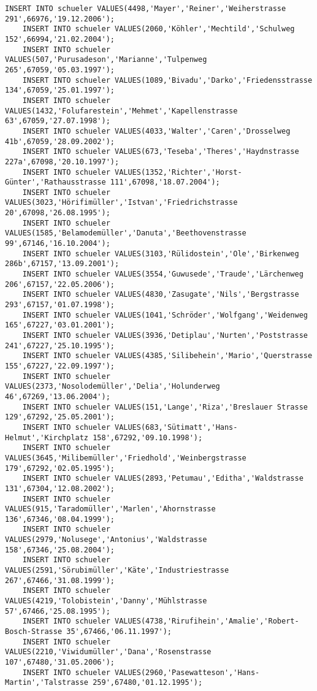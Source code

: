 \begin{lstlisting}[breaklines=True, numbers=none, basicstyle=\tiny, keepspaces=false]
	INSERT INTO schueler VALUES(4498,'Mayer','Reiner','Weiherstrasse 291',66976,'19.12.2006');
	INSERT INTO schueler VALUES(2060,'Köhler','Mechtild','Schulweg 152',66994,'21.02.2004');
	INSERT INTO schueler VALUES(507,'Purusadeson','Marianne','Tulpenweg 265',67059,'05.03.1997');
	INSERT INTO schueler VALUES(1089,'Bivadu','Darko','Friedensstrasse 134',67059,'25.01.1997');
	INSERT INTO schueler VALUES(1432,'Folufarestein','Mehmet','Kapellenstrasse 63',67059,'27.07.1998');
	INSERT INTO schueler VALUES(4033,'Walter','Caren','Drosselweg 41b',67059,'28.09.2002');
	INSERT INTO schueler VALUES(673,'Teseba','Theres','Haydnstrasse 227a',67098,'20.10.1997');
	INSERT INTO schueler VALUES(1352,'Richter','Horst-Günter','Rathausstrasse 111',67098,'18.07.2004');
	INSERT INTO schueler VALUES(3023,'Hörifimüller','Istvan','Friedrichstrasse 20',67098,'26.08.1995');
	INSERT INTO schueler VALUES(1585,'Belamodemüller','Danuta','Beethovenstrasse 99',67146,'16.10.2004');
	INSERT INTO schueler VALUES(3103,'Rülidostein','Ole','Birkenweg 286b',67157,'13.09.2001');
	INSERT INTO schueler VALUES(3554,'Guwusede','Traude','Lärchenweg 206',67157,'22.05.2006');
	INSERT INTO schueler VALUES(4830,'Zasugate','Nils','Bergstrasse 293',67157,'01.07.1998');
	INSERT INTO schueler VALUES(1041,'Schröder','Wolfgang','Weidenweg 165',67227,'03.01.2001');
	INSERT INTO schueler VALUES(3936,'Detiplau','Nurten','Poststrasse 241',67227,'25.10.1995');
	INSERT INTO schueler VALUES(4385,'Silibehein','Mario','Querstrasse 155',67227,'22.09.1997');
	INSERT INTO schueler VALUES(2373,'Nosolodemüller','Delia','Holunderweg 46',67269,'13.06.2004');
	INSERT INTO schueler VALUES(151,'Lange','Riza','Breslauer Strasse 129',67292,'25.05.2001');
	INSERT INTO schueler VALUES(683,'Sütimatt','Hans-Helmut','Kirchplatz 158',67292,'09.10.1998');
	INSERT INTO schueler VALUES(3645,'Milibemüller','Friedhold','Weinbergstrasse 179',67292,'02.05.1995');
	INSERT INTO schueler VALUES(2893,'Petumau','Editha','Waldstrasse 131',67304,'12.08.2002');
	INSERT INTO schueler VALUES(915,'Taradomüller','Marlen','Ahornstrasse 136',67346,'08.04.1999');
	INSERT INTO schueler VALUES(2979,'Nolusege','Antonius','Waldstrasse 158',67346,'25.08.2004');
	INSERT INTO schueler VALUES(2591,'Sörubimüller','Käte','Industriestrasse 267',67466,'31.08.1999');
	INSERT INTO schueler VALUES(4219,'Tolobistein','Danny','Mühlstrasse 57',67466,'25.08.1995');
	INSERT INTO schueler VALUES(4738,'Rirufihein','Amalie','Robert-Bosch-Strasse 35',67466,'06.11.1997');
	INSERT INTO schueler VALUES(2210,'Viwidumüller','Dana','Rosenstrasse 107',67480,'31.05.2006');
	INSERT INTO schueler VALUES(2960,'Pasewatteson','Hans-Martin','Talstrasse 259',67480,'01.12.1995');

\end{lstlisting}
